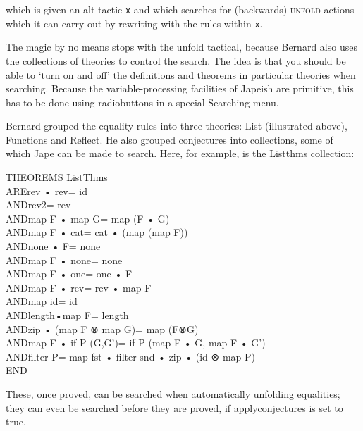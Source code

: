 which is given an alt tactic \texttt{x} and which searches for (backwards) \textsc{unfold} actions which it can carry out by rewriting with the rules within \texttt{x}.

The magic by no means stops with the unfold tactical, because Bernard also uses the collections of theories to control the search. The idea is that you should be able to `turn on and off' the definitions and theorems in particular theories when searching. Because the variable-processing facilities of Japeish are primitive, this has to be done using radiobuttons in a special Searching menu.

Bernard grouped the equality rules into three theories: List (illustrated above), Functions and Reflect. He also grouped conjectures into collections, some of which Jape can be made to search. Here, for example, is the Listthms collection:
\begin{japeish}
THEOREMS ListThms\\
ARE\tab rev • rev\tab = id\\
AND\tab rev2\tab = rev\\
AND\tab map F • map G\tab = map (F • G)\\
AND\tab map F • cat\tab = cat • (map (map F))\\
AND\tab none • F\tab = none\\
AND\tab map F • none\tab = none\\
AND\tab map F • one\tab = one • F\\
AND\tab map F • rev\tab = rev • map F\\
AND\tab map id\tab = id\\
AND\tab length•map F\tab = length\\
AND\tab zip • (map F ⊗ map G)\tab = map (F⊗G)\\
AND\tab map F • if P (G,G')\tab = if P (map F • G, map F • G')\\
AND\tab filter P\tab = map fst • filter snd • zip • (id ⊗ map P)\\
END
\end{japeish}

These, once proved, can be searched when automatically unfolding equalities; they can even be searched before they are proved, if applyconjectures is set to true.

